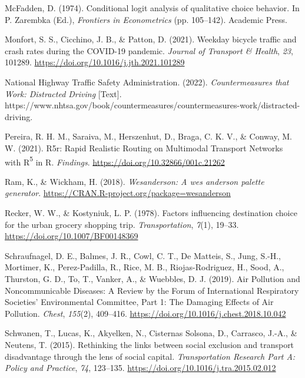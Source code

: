 \documentclass[
  letterpaper,
  authoryear,
  review,
  3p]{elsarticle}
\newlength{\cslhangindent}
\newlength{\cslentryspacingunit} %
\newenvironment{CSLReferences}[2] %
 {%
  \setlength{\parindent}{0pt}
  \ifodd #1
  \let\oldpar\par
  \def\par{\hangindent=\cslhangindent\oldpar}
  \fi
  \setlength{\parskip}{#2\cslentryspacingunit}
 }%
 {}
\begin{document}
\begin{CSLReferences}{1}{0}
\leavevmode{}%
McFadden, D. (1974). Conditional logit analysis of qualitative choice
behavior. In P. Zarembka (Ed.), \emph{Frontiers in {Econometrics}} (pp.
105--142). {Academic Press}.

\leavevmode{}%
Monfort, S. S., Cicchino, J. B., \& Patton, D. (2021). Weekday bicycle
traffic and crash rates during the {COVID-19} pandemic. \emph{Journal of
Transport \& Health}, \emph{23}, 101289.
\url{https://doi.org/10.1016/j.jth.2021.101289}

\leavevmode{}%
National Highway Traffic Safety Administration. (2022).
\emph{Countermeasures that {Work}: {Distracted Driving}} {[}Text{]}.
https://www.nhtsa.gov/book/countermeasures/countermeasures-work/distracted-driving.

\leavevmode{}%
Pereira, R. H. M., Saraiva, M., Herszenhut, D., Braga, C. K. V., \&
Conway, M. W. (2021). R5r: {Rapid Realistic Routing} on {Multimodal
Transport Networks} with {R}{\textsuperscript{5}} in {R}.
\emph{Findings}. \url{https://doi.org/10.32866/001c.21262}

\leavevmode{}%
Ram, K., \& Wickham, H. (2018). \emph{Wesanderson: A wes anderson
palette generator}. \url{https://CRAN.R-project.org/package=wesanderson}

\leavevmode{}%
Recker, W. W., \& Kostyniuk, L. P. (1978). Factors influencing
destination choice for the urban grocery shopping trip.
\emph{Transportation}, \emph{7}(1), 19--33.
\url{https://doi.org/10.1007/BF00148369}

\leavevmode{}%
Schraufnagel, D. E., Balmes, J. R., Cowl, C. T., De Matteis, S., Jung,
S.-H., Mortimer, K., Perez-Padilla, R., Rice, M. B., Riojas-Rodriguez,
H., Sood, A., Thurston, G. D., To, T., Vanker, A., \& Wuebbles, D. J.
(2019). Air {Pollution} and {Noncommunicable Diseases}: {A Review} by
the {Forum} of {International Respiratory Societies}' {Environmental
Committee}, {Part} 1: {The Damaging Effects} of {Air Pollution}.
\emph{Chest}, \emph{155}(2), 409--416.
\url{https://doi.org/10.1016/j.chest.2018.10.042}

\leavevmode{}%
Schwanen, T., Lucas, K., Akyelken, N., Cisternas Solsona, D., Carrasco,
J.-A., \& Neutens, T. (2015). Rethinking the links between social
exclusion and transport disadvantage through the lens of social capital.
\emph{Transportation Research Part A: Policy and Practice}, \emph{74},
123--135. \url{https://doi.org/10.1016/j.tra.2015.02.012}


\end{CSLReferences}
\end{document}

